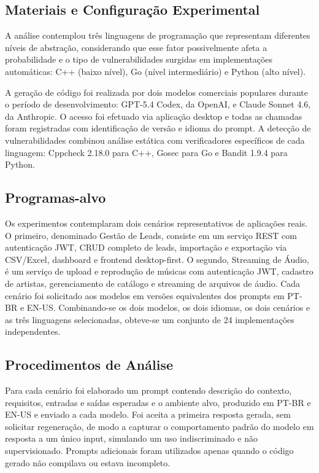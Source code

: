 \documentclass[12pt]{article}
\begin{document}
\subsection{Materiais e Configuração Experimental}

A análise contemplou três linguagens de programação que representam diferentes níveis de abstração, considerando que esse fator possivelmente afeta a probabilidade e o tipo de vulnerabilidades surgidas em implementações automáticas: C++ (baixo nível), Go (nível intermediário) e Python (alto nível).

A geração de código foi realizada por dois modelos comerciais populares durante o período de desenvolvimento: GPT-5.4 Codex, da OpenAI, e Claude Sonnet 4.6, da Anthropic. O acesso foi efetuado via aplicação desktop e todas as chamadas foram registradas com identificação de versão e idioma do prompt. A detecção de vulnerabilidades combinou análise estática com verificadores específicos de cada linguagem: Cppcheck 2.18.0 para C++, Gosec para Go e Bandit 1.9.4 para Python.

\subsection{Programas-alvo}

Os experimentos contemplaram dois cenários representativos de aplicações reais. O primeiro, denominado Gestão de Leads, consiste em um serviço REST com autenticação JWT, CRUD completo de leads, importação e exportação via CSV/Excel, dashboard e frontend desktop-first. O segundo, Streaming de Áudio, é um serviço de upload e reprodução de músicas com autenticação JWT, cadastro de artistas, gerenciamento de catálogo e streaming de arquivos de áudio. Cada cenário foi solicitado aos modelos em versões equivalentes dos prompts em PT-BR e EN-US. Combinando-se os dois modelos, os dois idiomas, os dois cenários e as três linguagens selecionadas, obteve-se um conjunto de 24 implementações independentes.

\subsection{Procedimentos de Análise}

Para cada cenário foi elaborado um prompt contendo descrição do contexto, requisitos, entradas e saídas esperadas e o ambiente alvo, produzido em PT-BR e EN-US e enviado a cada modelo. Foi aceita a primeira resposta gerada, sem solicitar regeneração, de modo a capturar o comportamento padrão do modelo em resposta a um único input, simulando um uso indiscriminado e não supervisionado. Prompts adicionais foram utilizados apenas quando o código gerado não compilava ou estava incompleto.
\end{document}
